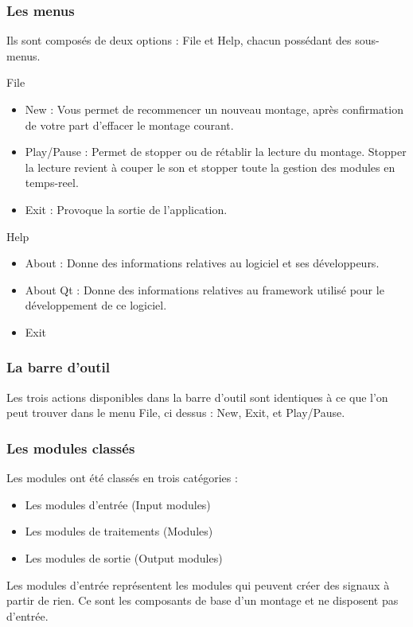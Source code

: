 \documentclass[a4paper,oneside,frenchb,12pt]{article}
\begin{document}
\subsubsection{Les menus}

Ils sont composés de deux options : File et Help, chacun possédant
des sous-menus.

File

\begin{itemize}
\item
  New : Vous permet de recommencer un nouveau montage, après
  confirmation de votre part d'effacer le montage courant.
\item
  Play/Pause : Permet de stopper ou de rétablir la lecture du
  montage. Stopper la lecture revient à couper le son et stopper
  toute la gestion des modules en temps-reel.
\item
  Exit : Provoque la sortie de l'application.
\end{itemize}
Help

\begin{itemize}
\item
  About : Donne des informations relatives au logiciel et ses
  développeurs.
\item
  About Qt : Donne des informations relatives au framework utilisé
  pour le développement de ce logiciel.
\item
  Exit
\end{itemize}
\subsubsection{La barre d'outil}

Les trois actions disponibles dans la barre d'outil sont identiques
à ce que l'on peut trouver dans le menu File, ci dessus : New,
Exit, et Play/Pause.

\subsubsection{Les modules classés}

Les modules ont été classés en trois catégories :

\begin{itemize}
\item
  Les modules d'entrée (Input modules)
\item
  Les modules de traitements (Modules)
\item
  Les modules de sortie (Output modules)
\end{itemize}
Les modules d'entrée représentent les modules qui peuvent créer des
signaux à partir de rien. Ce sont les composants de base d'un
montage et ne disposent pas d'entrée.
\end{document}
